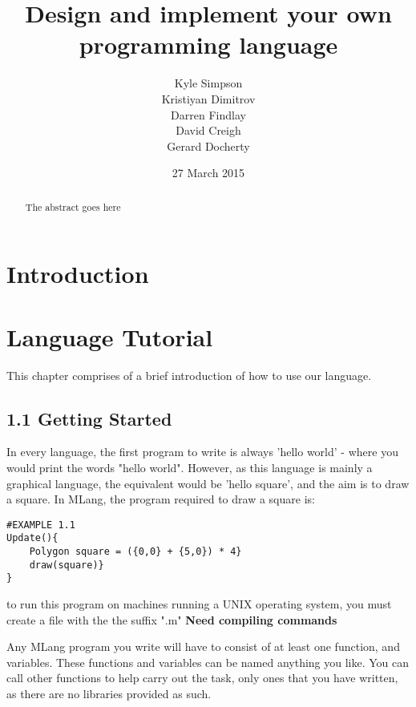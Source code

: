 \documentclass{l3proj}
\begin{document}
\title{Design and implement your own programming language}
\author{Kyle Simpson\\
		Kristiyan Dimitrov\\
        Darren Findlay\\
        David Creigh\\
		Gerard Docherty}
\date{27 March 2015}
\maketitle
\begin{abstract}

The abstract goes here

\end{abstract}
\educationalconsent
\tableofcontents
\chapter{Introduction}
\label{intro}


\chapter{Language Tutorial}
\label{tut}
This chapter comprises of a brief introduction of how to use our language.
\section{1.1 Getting Started}
In every language, the first program to write is always 'hello world' - where you would print the words "hello world". However, as this language is mainly a graphical language, the equivalent would be 'hello square', and the aim is to draw a square. In MLang, the program required to draw a square is:\\
\begin{lstlisting}
#EXAMPLE 1.1
Update(){
	Polygon square = ({0,0} + {5,0}) * 4}
	draw(square)}
}
\end{lstlisting}
to run this program on machines running a UNIX operating system, you must create a file with the the suffix ".m"
\textbf{Need compiling commands}

Any MLang program you write will have to consist of at least one function, and variables. These functions and variables can be named anything you like. You can call other functions to help carry out the task, only ones that you have written, as there are no libraries provided as such. 
\end{document}
